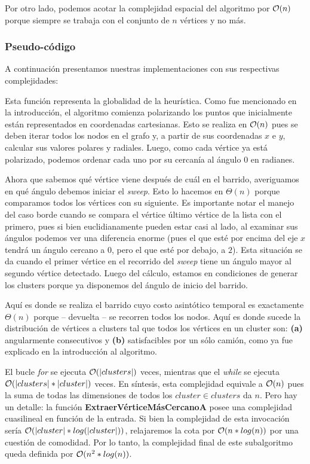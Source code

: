 Por otro lado, podemos acotar la complejidad espacial del algoritmo por $\mathcal{O}(n)$ porque siempre se trabaja con el conjunto de $n$ vértices y no más.

\subsubsection{Pseudo-código}
A continuación presentamos nuestras implementaciones con sus respectivas complejidades:


Esta función representa la globalidad de la heurística. Como fue mencionado en la introducción, el algoritmo comienza polarizando los puntos que inicialmente están representados en coordenadas cartesianas. Esto se realiza en $\mathcal{O}(n)$ pues se deben iterar todos los nodos en el grafo y, a partir de sus coordenadas $x$ e $y$, calcular sus valores polares y radiales. Luego, como cada vértice ya está polarizado, podemos ordenar cada uno por su cercanía al ángulo $0$ en radianes.


Ahora que sabemos qué vértice viene después de cuál en el barrido, averiguamos en qué ángulo debemos iniciar el \textit{sweep}. Esto lo hacemos en $\Theta(n)$ porque comparamos todos los vértices con su siguiente. Es importante notar el manejo del caso borde cuando se compara el vértice último vértice de la lista con el primero, pues si bien euclidianamente pueden estar casi al lado, al examinar sus ángulos podemos ver una diferencia enorme (pues el que esté por encima del eje $x$ tendrá un ángulo cercano a $0$, pero el que esté por debajo, a $2$). Esta situación se da cuando el primer vértice en el recorrido del \textit{sweep} tiene un ángulo mayor al segundo vértice detectado. Luego del cálculo, estamos en condiciones de generar los clusters porque ya disponemos del ángulo de inicio del barrido.


Aquí es donde se realiza el barrido cuyo costo asintótico temporal es exactamente $\Theta(n)$ porque – devuelta – se recorren todos los nodos. Aquí es donde sucede la distribución de vértices a clusters tal que todos los vértices en un cluster son: \textbf{(a)} angularmente consecutivos y \textbf{(b)} satisfacibles por un sólo camión, como ya fue explicado en la introducción al algoritmo.


El bucle \textit{for} se ejecuta $\mathcal{O}(|clusters|)$ veces, mientras que el \textit{while} se ejecuta $\mathcal{O}(|clusters| * |cluster|)$ veces. En síntesis, esta complejidad equivale a $\mathcal{O}(n)$ pues la suma de todas las dimensiones de todos los $cluster \in clusters$ da $n$. Pero hay un detalle: la función \textbf{ExtraerVérticeMásCercanoA} posee una complejidad cuasilineal en función de la entrada. Si bien la complejidad de esta invocación sería $\mathcal{O}(|cluster| * log(|cluster|))$, relajaremos la cota por $\mathcal{O}(n*log(n))$ por una cuestión de comodidad. Por lo tanto, la complejidad final de este subalgoritmo queda definida por $\mathcal{O}(n^2*log(n))$.

